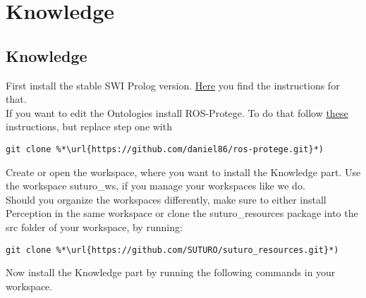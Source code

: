 \documentclass[main.tex]{subfiles}
\begin{document}
\section{Knowledge}
\subsection{Knowledge}
First install the stable SWI Prolog version. \href{https://www.swi-prolog.org/build/PPA.html}{Here} you find the instructions for that.\\
If you want to edit the Ontologies install ROS-Protege. To do that follow \href{https://github.com/protegeproject/protege/wiki/Building-from-Source}{these} instructions, but replace step one with
\begin{lstlisting}
git clone %*\url{https://github.com/daniel86/ros-protege.git}*)
\end{lstlisting}

Create or open the workspace, where you want to install the Knowledge part.
Use the workspace suturo\_ws, if you manage your workspaces like we do.\\
Should you organize the workspaces differently, make sure to either install Perception in the same workspace or clone the suturo\_resources package into the src folder of your workspace, by running:
\begin{lstlisting}
git clone %*\url{https://github.com/SUTURO/suturo_resources.git}*) 
\end{lstlisting}



Now install the Knowledge part by running the following commands in your workspace.\\
\begin{mdframed}[backgroundcolor=mygray, rightline=false]

\end{mdframed}
\end{document}
